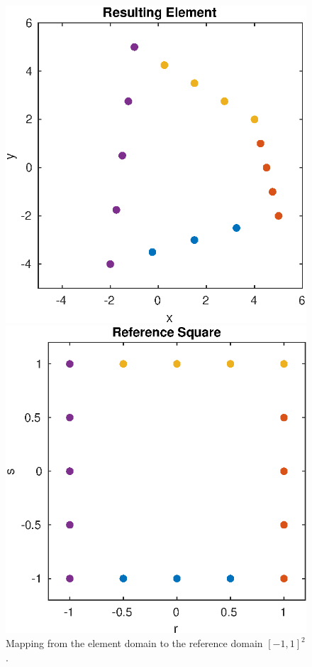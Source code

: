 \documentclass{article}
\begin{document}
\begin{figure}[H]
  \centering
  \begin{minipage}{.4\textwidth}
    \centering
  \includegraphics[width=\linewidth]{media/5-1-xy.eps}
  \end{minipage}%
  \begin{minipage}{.4\textwidth}
    \centering
  \includegraphics[width=\linewidth]{media/5-1-rs.eps}
  \end{minipage}%
  \caption{Mapping from the element domain to the reference domain $[-1,1]^2$.}
\end{figure}
\end{document}
